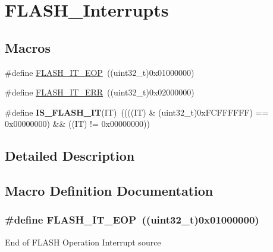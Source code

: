 \hypertarget{group___f_l_a_s_h___interrupts}{\section{F\-L\-A\-S\-H\-\_\-\-Interrupts}
\label{group___f_l_a_s_h___interrupts}
}
\subsection*{Macros}
\begin{DoxyCompactItemize}
\item 
\#define \hyperlink{group___f_l_a_s_h___interrupts_gaea20e80e1806d58a7544cfe8659e7f11}{F\-L\-A\-S\-H\-\_\-\-I\-T\-\_\-\-E\-O\-P}~((uint32\-\_\-t)0x01000000)
\item 
\#define \hyperlink{group___f_l_a_s_h___interrupts_ga4e2c23ab8c1b9a5ee49bf6d695d9ae8c}{F\-L\-A\-S\-H\-\_\-\-I\-T\-\_\-\-E\-R\-R}~((uint32\-\_\-t)0x02000000)
\item 
\hypertarget{group___f_l_a_s_h___interrupts_ga46ee77d0be1f3e0a14ded0651163ae11}{\#define {\bfseries I\-S\-\_\-\-F\-L\-A\-S\-H\-\_\-\-I\-T}(I\-T)~((((I\-T) \& (uint32\-\_\-t)0x\-F\-C\-F\-F\-F\-F\-F\-F) == 0x00000000) \&\& ((\-I\-T) != 0x00000000))}\label{group___f_l_a_s_h___interrupts_ga46ee77d0be1f3e0a14ded0651163ae11}

\end{DoxyCompactItemize}


\subsection{Detailed Description}


\subsection{Macro Definition Documentation}
\hypertarget{group___f_l_a_s_h___interrupts_gaea20e80e1806d58a7544cfe8659e7f11}{
\subsubsection[{F\-L\-A\-S\-H\-\_\-\-I\-T\-\_\-\-E\-O\-P}]{\setlength{\rightskip}{0pt plus 5cm}\#define F\-L\-A\-S\-H\-\_\-\-I\-T\-\_\-\-E\-O\-P~((uint32\-\_\-t)0x01000000)}}\label{group___f_l_a_s_h___interrupts_gaea20e80e1806d58a7544cfe8659e7f11}
End of F\-L\-A\-S\-H Operation Interrupt source 

